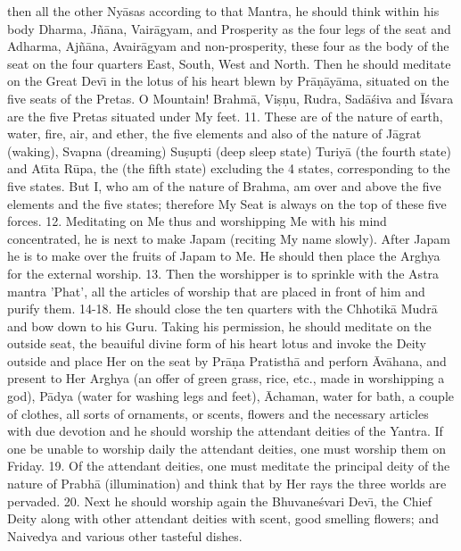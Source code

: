 then all the other Ny\=asas according to that Mantra, he should think within his body Dharma, J\~n\=ana, Vair\=agyam, and Prosperity as the four legs of the seat and Adharma, Aj\~n\=ana, Avair\=agyam and non-prosperity, these four as the body of the seat on the four quarters East, South, West and North. Then he should meditate on the Great Dev\={\i} in the lotus of his heart blewn by Pr\=a\d{n}\=ay\=ama, situated on the five seats of the Pretas. O Mountain! Brahm\=a, Vi\d{s}\d{n}u, Rudra, Sad\=a\'siva and \=I\'svara are the five Pretas situated under My feet.
11. These are of the nature of earth, water, fire, air, and ether, the five elements and also of the nature of J\=agrat (waking), Svapna (dreaming) Su\d{s}upti (deep sleep state) Turiy\=a (the fourth state) and At\={\i}ta R\=upa, the (the fifth state) excluding the 4 states, corresponding to the five states. But I, who am of the nature of Brahma, am over and above the five elements and the five states; therefore My Seat is always on the top of these five forces.
12. Meditating on Me thus and worshipping Me with his mind concentrated, he is next to make Japam (reciting My name slowly). After Japam he is to make over the fruits of Japam to Me. He should then place the Arghya for the external worship.
13. Then the worshipper is to sprinkle with the Astra mantra 'Phat', all the articles of worship that are placed in front of him and purify them.
14-18. He should close the ten quarters with the Chhotik\=a Mudr\=a and bow down to his Guru. Taking his permission, he should meditate on the outside seat, the beauiful divine form of his heart lotus and invoke the Deity outside and place Her on the seat by Pr\=a\d{n}a Pratisth\=a and perforn \=Av\=ahana, and present to Her Arghya (an offer of green grass, rice, etc., made in worshipping a god), P\=adya (water for washing legs and feet), \=Achaman, water for bath, a couple of clothes, all sorts of ornaments, or scents, flowers and the necessary articles with due devotion and he should worship the attendant deities of the Yantra. If one be unable to worship daily the attendant deities, one must worship them on Friday.
19. Of the attendant deities, one must meditate the principal deity of the nature of Prabh\=a (illumination) and think that by Her rays the three worlds are pervaded.
20. Next he should worship again the Bhuvane\'svari Dev\={\i}, the Chief Deity along with other attendant deities with scent, good smelling flowers; and Naivedya and various other tasteful dishes.

